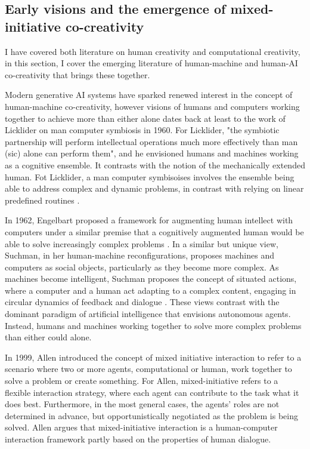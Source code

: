 \subsection{Early visions and the emergence of mixed-initiative co-creativity}

I have covered both literature on human creativity and computational creativity, in this section, I cover the emerging literature of human-machine and human-AI co-creativity that brings these together. 

Modern generative AI systems have sparked renewed interest in the concept of human-machine co-creativity, however visions of humans and computers working together to achieve more than either alone dates back at least to the work of Licklider on man computer symbiosis in 1960. For Licklider, "the symbiotic partnership will perform intellectual operations much more effectively than man (sic) alone can perform them", and he envisioned humans and machines working as a cognitive ensemble. It contrasts with the notion of the mechanically extended human. Fot Licklider, a man computer symbisoises involves the ensemble being able to address complex and dynamic problems, in contrast with relying on linear predefined routines \cite{Licklider1960-md}. 

In 1962, Engelbart proposed a framework for augmenting human intellect with computers under a similar premise that a cognitively augmented human would be able to solve increasingly complex problems \cite{Engelbart1962-ir}. In a similar but unique view, Suchman, in her human-machine reconfigurations, proposes machines and computers as social objects, particularly as they become more complex. As machines become intelligent, Suchman proposes the concept of situated actions, where a computer and a human act adapting to a complex content, engaging in circular dynamics of feedback and dialogue \cite{Suchman1987-fs}. These views contrast with the dominant paradigm of artificial intelligence that envisions autonomous agents. Instead, humans and machines working together to solve more complex problems than either could alone. 

In 1999, Allen \cite{Allen1999-sr} introduced the concept of mixed initiative interaction to refer to a scenario where two or more agents, computational or human, work together to solve a problem or create something. For Allen, mixed-initiative refers to a flexible interaction strategy, where each agent can contribute to the task what it does best. Furthermore, in the most general cases, the agents’ roles are not determined in advance, but opportunistically negotiated as the problem is being solved. Allen argues that mixed-initiative interaction is a human-computer interaction framework partly based on the properties of human dialogue. 

